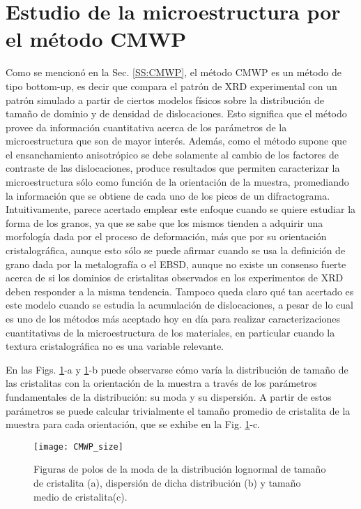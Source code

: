 \section{Estudio de la microestructura por el método CMWP}\label{S:IFCMWP}
Como se mencionó en la Sec. \ref{SS:CMWP}, el método CMWP es un método de tipo bottom-up, es decir que compara el patrón de XRD experimental con un patrón simulado a partir de ciertos modelos físicos sobre la distribución de tamaño de dominio y de densidad de dislocaciones.
Esto significa que el método provee da información cuantitativa acerca de los parámetros de la microestructura que son de mayor interés.
Además, como el método supone que el ensanchamiento anisotrópico se debe solamente al cambio de los factores de contraste de las dislocaciones, produce resultados que permiten caracterizar la microestructura sólo como función de la orientación de la muestra, promediando la información que se obtiene de cada uno de los picos de un difractograma.
Intuitivamente, parece acertado emplear este enfoque cuando se quiere estudiar la forma de los granos, ya que se sabe que los mismos tienden a adquirir una morfología dada por el proceso de deformación, más que por su orientación cristalográfica, aunque esto sólo se puede afirmar cuando se usa la definición de grano dada por la metalografía o el EBSD, aunque no existe un consenso fuerte acerca de si los dominios de cristalitas observados en los experimentos de XRD deben responder a la misma tendencia.
Tampoco queda claro qué tan acertado es este modelo cuando se estudia la acumulación de dislocaciones, a pesar de lo cual es uno de los métodos más aceptado hoy en día para realizar caracterizaciones cuantitativas de la microestructura de los materiales, en particular cuando la textura cristalográfica no es una variable relevante.

En las Figs. \ref{fig:IFCMWPSize}-a y \ref{fig:IFCMWPSize}-b puede observarse cómo varía la distribución de tamaño de las cristalitas con la orientación de la muestra a través de los parámetros fundamentales de la distribución: su moda y su dispersión.
A partir de estos parámetros se puede calcular trivialmente el tamaño promedio de cristalita de la muestra para cada orientación, que se exhibe en la Fig. \ref{fig:IFCMWPSize}-c.

\begin{figure}[!htb]
  \centering
  \texttt{[image: CMWP\_size]}
  \caption{Figuras de polos de la moda de la distribución lognormal de tamaño de cristalita (a), dispersión de dicha distribución (b) y tamaño medio de cristalita(c).}
  \label{fig:IFCMWPSize}
\end{figure}

